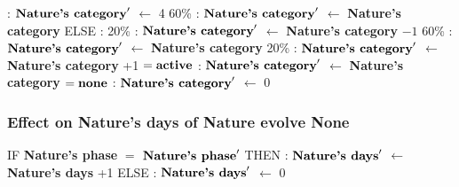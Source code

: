 \documentclass{article}%
\begin{document}
\begin{flushleft}
: %
$\mbox{\textbf{Nature's category}} '$%
$\leftarrow$%
4%
\linebreak%
\hspace*{10em}%
60\%%
: %
$\mbox{\textbf{Nature's category}} '$%
$\leftarrow$%
\textbf{Nature's category}%
\linebreak%
\hspace*{8em}%
ELSE %
: %
\linebreak%
\hspace*{10em}%
20\%%
: %
$\mbox{\textbf{Nature's category}} '$%
$\leftarrow$%
\textbf{Nature's category}%
${-}1$%
\linebreak%
\hspace*{10em}%
60\%%
: %
$\mbox{\textbf{Nature's category}} '$%
$\leftarrow$%
\textbf{Nature's category}%
\linebreak%
\hspace*{10em}%
20\%%
: %
$\mbox{\textbf{Nature's category}} '$%
$\leftarrow$%
\textbf{Nature's category}%
+1%
\linebreak%
\hspace*{2em}%
$= \mbox{\textbf{active}}$%
: %
$\mbox{\textbf{Nature's category}} '$%
$\leftarrow$%
\textbf{Nature's category}%
\linebreak%
\hspace*{2em}%
$= \mbox{\textbf{none}}$%
: %
$\mbox{\textbf{Nature's category}} '$%
$\leftarrow$%
0%
\end{flushleft}

%
\subsubsection{Effect on Nature's days of Nature evolve None}%
\label{ssubsec:Effect on Nature's days of Nature evolve None}%
\begin{flushleft}%
IF %
\textbf{Nature's phase}%
$=$%
$\mbox{\textbf{Nature's phase}} '$%
\linebreak%
\hspace*{2em}%
THEN %
: %
$\mbox{\textbf{Nature's days}} '$%
$\leftarrow$%
\textbf{Nature's days}%
+1%
\linebreak%
\hspace*{2em}%
ELSE %
: %
$\mbox{\textbf{Nature's days}} '$%
$\leftarrow$%
0%
\end{flushleft}

%
\end{document}
